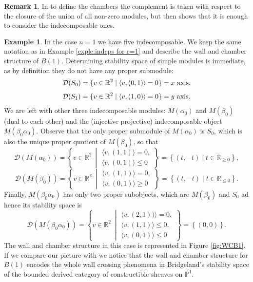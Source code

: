 \documentclass[11pt]{amsart}
\theoremstyle{definition}
\newtheorem{example}[theorem]{Example}
\newtheorem{remark}[theorem]{Remark}
\begin{document}
    \begin{remark}
    In \cite{WC_structure} to define the chambers the complement is taken with respect to the closure of the union of all non-zero modules, but then \cite[Proposition 12]{WC_structure} shows that it is enough to consider the indecomposable ones. 
    \end{remark}

    \begin{example}\label{exple : WC r=1} In the case $n=1$ we have five indecomposable. We keep the same notation as in Example \ref{exple:indcps for r=1} and describe the wall and chamber structure of $B(1)$. Determining stability space of simple modules is immediate, as by definition they do not have any proper submodule:
    \[
    \mathcal{D}(S_0)=\{v\in \mathbb{R}^2\mid \langle v, (0,1)\rangle=0\}=\hbox{$x$ axis},
    \]
    \[
    \mathcal{D}(S_1)=\{v\in \mathbb{R}^2\mid \langle v, (1,0)\rangle=0\}=\hbox{$y$ axis}.
    \]
    We are left with other three indecomposable modules: $M(\alpha_0)$ and $M(\beta_0)$ (dual to each other) and the (injective-projective) indecomposable object $M(\beta_0\alpha_0)$. Observe that the only proper submodule of $M(\alpha_0)$ is $S_0$, which is also the unique proper quotient of $M(\beta_0)$, so that
    \[
\mathcal{D}(M(\alpha_0))=\left\{v\in \mathbb{R}^2\ \middle\vert 
\begin{array}{c}
   \langle v, (1,1)\rangle=0,  \\
    \langle v, (0,1)\rangle\leq  0
\end{array}
\right\}=\left\{(t,-t)\mid t\in \mathbb{R}_{\geq 0}
\right\},
    \]
     \[
\mathcal{D}(M(\beta_0))=\left\{v\in \mathbb{R}^2\ \middle\vert
\begin{array}{c}
   \langle v, (1,1)\rangle=0,  \\
    \langle v, (0,1)\rangle\geq  0
\end{array}
\right\}=\left\{(t,-t)\mid t\in \mathbb{R}_{\leq 0}
\right\}.
    \]
    Finally, $M(\beta_0\alpha_0)$ has  only two proper subobjects, which are  $M(\beta_0)$ and $S_0$ ad hence its stability space is
\[
\mathcal{D}(M(\beta_0\alpha_0))= \left\{v\in \mathbb{R}^2\ \middle\vert
\begin{array}{c}
   \langle v, (2,1))\rangle=0, \\ \langle v, (1,1)\rangle\leq 0,  \\
    \langle v, (0,1)\rangle\leq  0
\end{array}
\right\}=\left\{(0,0)
\right\}.
\]
The wall and chamber structure in this case is represented in Figure \ref{fig:WCB1}. If we compare our picture with \cite[Figure 2]{MR2739061} we notice that the wall and chamber structure for $B(1)$ encodes the whole wall crossing phenomena in Bridgeland's stability space of the bounded derived category of constructible sheaves on $\mathbb{P}^1$.

\end{example}
\end{document}
